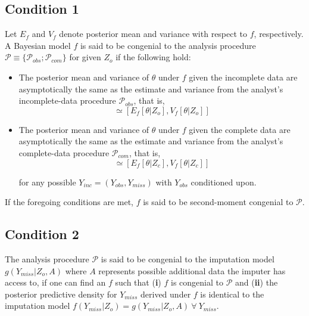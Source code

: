 \documentclass[
  letterpaper,
  DIV=11,
  numbers=noendperiod]{scrreprt}
\begin{document}
\hypertarget{condition-1}{%
\subsection*{Condition 1}\label{condition-1}}

Let \(E_f\) and \(V_f\) denote posterior mean and variance with respect
to \(f\), respectively. A Bayesian model \(f\) is said to be congenial
to the analysis procedure
\(\mathscr{P} \equiv \{\mathscr{P}_{obs}; \mathscr{P}_{com}\}\) for
given \(Z_o\) if the following hold:

\begin{itemize}
\item
  The posterior mean and variance of \(\theta\) under \(f\) given the
  incomplete data are asymptotically the same as the estimate and
  variance from the analyst's incomplete-data procedure
  \(\mathscr{P}_{obs}\), that is, \begin{equation}
      [\hat{\theta}(Z_o), U(Z_o)] \simeq [E_f[\theta | Z_o], V_f[\theta | Z_o]]
  \end{equation}
\item
  The posterior mean and variance of \(\theta\) under \(f\) given the
  complete data are asymptotically the same as the estimate and variance
  from the analyst's complete-data procedure \(\mathscr{P}_{com}\), that
  is, \begin{equation}
       [\hat{\theta}(Z_c), U(Z_c)] \simeq [E_f[\theta | Z_c], V_f[\theta | Z_c]]
  \end{equation}

  for any possible \(Y_{inc} = (Y_{obs}, Y_{miss})\) with \(Y_{obs}\)
  conditioned upon.
\end{itemize}

If the foregoing conditions are met, \(f\) is said to be second-moment
congenial to \(\mathscr{P}\).

\hypertarget{condition-2}{%
\subsection*{Condition 2}\label{condition-2}}

The analysis procedure \(\mathscr{P}\) is said to be congenial to the
imputation model \(g(Y_{miss}|Z_o, A)\) where \(A\) represents possible
additional data the imputer has access to, if one can find an \(f\) such
that (\textbf{i}) \(f\) is congenial to \(\mathscr{P}\) and
(\textbf{ii}) the posterior predictive density for \(Y_{miss}\) derived
under \(f\) is identical to the imputation model
\(f(Y_{miss}|Z_o) = g(Y_{miss}|Z_o, A) \ \forall \ Y_{miss}\).
\end{document}
